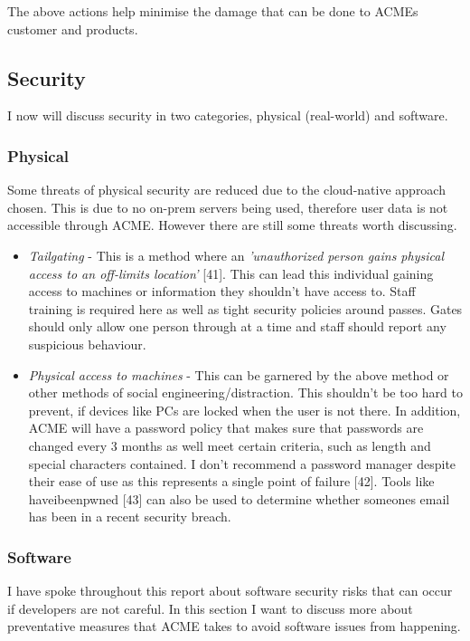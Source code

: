   The above actions help minimise the damage that can be done to ACMEs customer and products.

  \subsection{Security}
  I now will discuss security in two categories, physical (real-world) and software.

  \subsubsection{Physical}
  \vspace{0.2cm}
  Some threats of physical security are reduced due to the cloud-native approach chosen. This is due to no on-prem servers being used, therefore 
  user data is not accessible through ACME. However there are still some threats worth discussing.

  \begin{itemize}
    \item \textit{Tailgating} - This is a method where an \textit{'unauthorized person gains physical access to an off-limits location'} [41]. This can 
    lead this individual gaining access to machines or information they shouldn't have access to. Staff training is required here as well as tight security
    policies around passes. Gates should only allow one person through at a time and staff should report any suspicious behaviour.

    \item \textit{Physical access to machines} - This can be garnered by the above method or other methods of social engineering/distraction. This shouldn't
    be too hard to prevent, if devices like PCs are locked when the user is not there. In addition, ACME will have a password policy that makes sure that 
    passwords are changed every 3 months as well meet certain criteria, such as length and special characters contained. I don't recommend a password manager 
    despite their ease of use as this represents a single point of failure [42]. Tools like haveibeenpwned [43] can also be used to determine whether someones 
    email has been in a recent security breach.
  
  \end{itemize}

  \subsubsection{Software}
  I have spoke throughout this report about software security risks that can occur if developers are not careful. In this section I want to discuss
  more about preventative measures that ACME takes to avoid software issues from happening.

